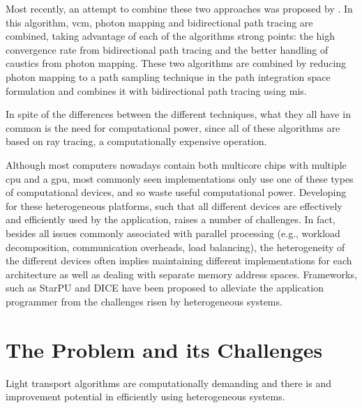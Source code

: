 Most recently, an attempt to combine these two approaches was proposed by \cite{Georgiev}. In this algorithm, \gls{vcm}, photon mapping and bidirectional path tracing are combined, taking advantage of each of the algorithms strong points: the high convergence rate from bidirectional path tracing and the better handling of caustics from photon mapping. These two algorithms are combined by reducing photon mapping to a path sampling technique in the path integration space formulation and combines it with bidirectional path tracing using \gls{mis}.

In spite of the differences between the different techniques, what they all have in common is the need for computational power, since all of these algorithms are based on ray tracing, a computationally expensive operation.

Although most computers nowadays contain both multicore chips with multiple \gls{cpu} and a \gls{gpu}, most commonly seen implementations only use one of these types of computational devices, and so waste useful computational power. Developing for these heterogeneous platforms, such that all different devices are effectively and efficiently used by the application, raises a number of challenges. In fact, besides all issues commonly associated with parallel processing (e.g., workload decomposition, communication overheads, load balancing), the heterogeneity of the different devices often implies maintaining different implementations for each architecture as well as dealing with separate memory address spaces.
Frameworks, such as StarPU \citep{augonnet2011starpu} and DICE \citep{Barbosa} have been proposed to alleviate the application programmer from the challenges risen by heterogeneous systems. 

\section{The Problem and its Challenges}


Light transport algorithms are computationally demanding and there is and improvement potential in efficiently using heterogeneous systems.

